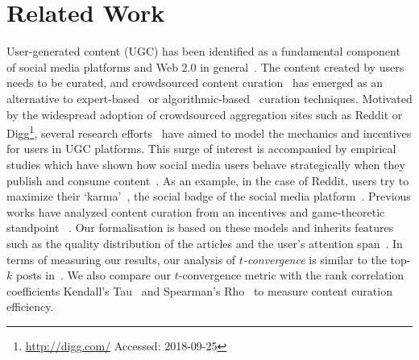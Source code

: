 \section{Related Work}
User-generated content (UGC) has been identified as a fundamental component of social media platforms and Web 2.0 in general~\cite{kaplan2010users}. The content created by users needs to be curated, and crowdsourced content curation~\cite{askalidis2013theoretical} has emerged as an alternative to expert-based~\cite{stanoevska2012content} or algorithmic-based~\cite{rader2015understanding} curation techniques. Motivated by the widespread adoption of crowdsourced aggregation sites such as Reddit or Digg\footnote{\url{http://digg.com/} Accessed: 2018-09-25}, several research efforts~\cite{das2010ranking,ghosh2011incentivizing,abbassi2014distributed} have aimed to model the mechanics and incentives for users in UGC platforms. This surge of interest is accompanied by empirical studies which have shown how
social media users behave strategically when they publish and consume content~\cite{may2014filter}. As an example, in the case of Reddit, users try to maximize their `karma'~\cite{bergstrom2011don}, the social badge of the social media platform~\cite{anderson2013steering}.
Previous works have analyzed content curation from an incentives and game-theoretic standpoint~\cite{ghosh2011incentivizing,das2010ranking,gupte2009news,may2014filter,abbassi2014distributed} . Our formalisation is based on these models and inherits features such as the quality distribution of the articles and the user's attention span~\cite{askalidis2013theoretical,ghosh2011incentivizing}. In terms of measuring our results, our analysis of \textit{$t$-convergence} is similar to the top-$k$ posts in~\cite{askalidis2013theoretical}. We also compare our $t$-convergence metric with the rank correlation coefficients Kendall's Tau~\cite{kendall1955rank} and Spearman's Rho~\cite{spearman1904proof} to measure content curation efficiency.

